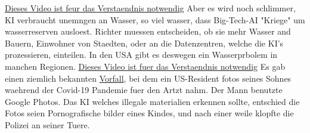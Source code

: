 \documentclass{report}
\begin{document}
\newline
\hyperlink{https://youtube.com/watch?v=5NUD7rdbCm8}{Dieses Video ist feur das Verstaendnis notwendig}
\newline
\newline
Aber es wird noch schlimmer, KI verbraucht unemngen an Wasser, so viel wasser, dass Big-Tech-AI "Kriege" um wasserreserven ausloest. Richter muessen entscheiden, ob sie mehr Wasser and Bauern, Einwohner von Staedten, oder an die Datenzentren, welche die KI's prozessieren, einteilen.
In den USA gibt es deswegen ein Wasserprbolem in manchen Regionen. 
\newline
\hyperlink{https://youtube.com/watch?v=F-6la_I-xkQ}{Dieses Video ist fuer das Verstaendnis notwendig}
\newline
\newline
Es gab einen ziemlich bekannten \hyperlink{https://www.nytimes.com/2022/08/21/technology/google-surveillance-toddler-photo.html}{Vorfall}, bei dem ein US-Resident fotos seines Sohnes waehrend der Covid-19 Pandemie fuer den Artzt nahm. Der Mann benutzte Google Photos. Das KI welches illegale materialien erkennen sollte, entschied die Fotos seien Pornografische bilder eines Kindes, und nach einer weile klopfte die Polizei an seiner Tuere.

\printbibliography
\end{document}
